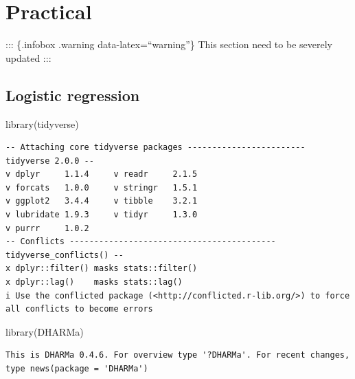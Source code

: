 \documentclass[
  letterpaper,
  DIV=11,
  numbers=noendperiod]{scrreprt}
\newenvironment{Shaded}{\begin{snugshade}}{\end{snugshade}}
\newcommand{\FunctionTok}[1]{\textcolor[rgb]{0.28,0.35,0.67}{#1}}
\newcommand{\NormalTok}[1]{\textcolor[rgb]{0.00,0.23,0.31}{#1}}
\begin{document}
\section{Practical}\label{practical-1}

::: \{.infobox .warning data-latex=``warning''\} This section need to
be severely updated :::

\subsection{Logistic regression}\label{logistic-regression}

\begin{Shaded}
\begin{Highlighting}[]
\FunctionTok{library}\NormalTok{(tidyverse)}
\end{Highlighting}
\end{Shaded}

\begin{verbatim}
-- Attaching core tidyverse packages ------------------------ tidyverse 2.0.0 --
v dplyr     1.1.4     v readr     2.1.5
v forcats   1.0.0     v stringr   1.5.1
v ggplot2   3.4.4     v tibble    3.2.1
v lubridate 1.9.3     v tidyr     1.3.0
v purrr     1.0.2     
-- Conflicts ------------------------------------------ tidyverse_conflicts() --
x dplyr::filter() masks stats::filter()
x dplyr::lag()    masks stats::lag()
i Use the conflicted package (<http://conflicted.r-lib.org/>) to force all conflicts to become errors
\end{verbatim}

\begin{Shaded}
\begin{Highlighting}[]
\FunctionTok{library}\NormalTok{(DHARMa)}
\end{Highlighting}
\end{Shaded}

\begin{verbatim}
This is DHARMa 0.4.6. For overview type '?DHARMa'. For recent changes, type news(package = 'DHARMa')
\end{verbatim}
\end{document}
